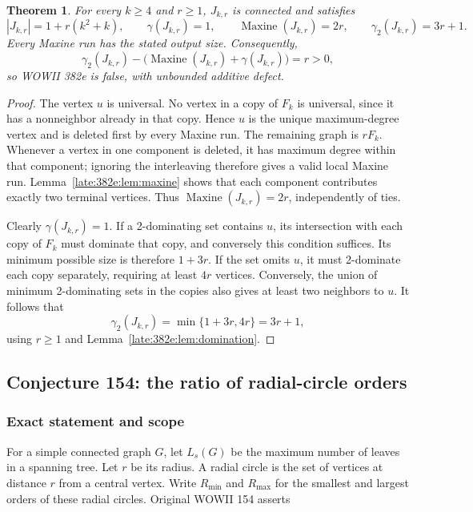 \documentclass[11pt,a4paper]{article}
\newtheorem{theorem}{Theorem}[section]
\theoremstyle{definition}\newtheorem{definition}[theorem]{Definition}
\theoremstyle{remark}\newtheorem{remark}[theorem]{Remark}
\begin{document}
\begin{theorem}\label{late:382e:thm:main}
For every $k\geq4$ and $r\geq1$, $J_{k,r}$ is connected and satisfies
\[
 |J_{k,r}|=1+r(k^2+k),\qquad
 \gamma(J_{k,r})=1,\qquad
 \operatorname{Maxine}(J_{k,r})=2r,\qquad
 \gamma_2(J_{k,r})=3r+1.
\]
Every Maxine run has the stated output size. Consequently,
\[
 \gamma_2(J_{k,r})-\bigl(\operatorname{Maxine}(J_{k,r})+\gamma(J_{k,r})\bigr)=r>0,
\]
so WOWII 382e is false, with unbounded additive defect.
\end{theorem}
\begin{proof}
The vertex $u$ is universal. No vertex in a copy of $F_k$ is universal,
since it has a nonneighbor already in that copy. Hence $u$ is the unique
maximum-degree vertex and is deleted first by every Maxine run.
The remaining graph is $rF_k$. Whenever a vertex in one component is
deleted, it has maximum degree within that component; ignoring the
interleaving therefore gives a valid local Maxine run. Lemma~\ref{late:382e:lem:maxine}
shows that each component contributes exactly two terminal vertices.
Thus $\operatorname{Maxine}(J_{k,r})=2r$, independently of ties.

Clearly $\gamma(J_{k,r})=1$. If a 2-dominating set contains $u$, its
intersection with each copy of $F_k$ must dominate that copy, and conversely
this condition suffices. Its minimum possible size is therefore $1+3r$.
If the set omits $u$, it must 2-dominate each copy separately, requiring
at least $4r$ vertices. Conversely, the union of minimum 2-dominating
sets in the copies also gives at least two neighbors to $u$.
It follows that
\[
 \gamma_2(J_{k,r})=\min\{1+3r,4r\}=3r+1,
\]
using $r\geq1$ and Lemma~\ref{late:382e:lem:domination}.
\end{proof}


\subsection{Conjecture 154: the ratio of radial-circle orders}\label{late:154}

\subsubsection{Exact statement and scope}\label{late:154:exact-statement-and-scope}

For a simple connected graph \(G\), let \(L_s(G)\) be the maximum number
of leaves in a spanning tree. Let \(r\) be its radius. A radial circle
is the set of vertices at distance \(r\) from a central vertex. Write
\(R_{\min}\) and \(R_{\max}\) for the smallest and largest orders of
these radial circles. Original WOWII 154 asserts
\end{document}
